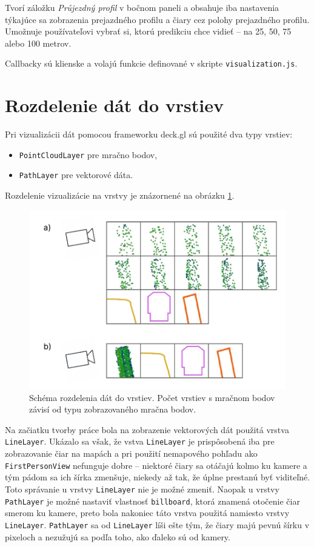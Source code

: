Tvorí záložku \emph{Průjezdný profil} v bočnom paneli a obsahuje iba nastavenia týkajúce sa zobrazenia prejazdného profilu a čiary cez polohy prejazdného profilu. Umožnuje používateľovi vybrať si, ktorú predikciu chce vidieť -- na 25, 50, 75 alebo 100 metrov.

Callbacky sú klienske a volajú funkcie definované v skripte \texttt{visualization.js}.

\section{Rozdelenie dát do vrstiev}
\label{sec:vrstvy}

Pri vizualizácii dát pomocou frameworku deck.gl sú použité dva typy vrstiev:
\begin{itemize}
    \item \texttt{PointCloudLayer} pre mračno bodov,
    \item \texttt{PathLayer} pre vektorové dáta.
\end{itemize}
Rozdelenie vizualizácie na vrstvy je znázornené na obrázku \ref{fig:vrstvy}.

\begin{figure}[h]
    \centering
    \includegraphics[width=0.8\linewidth]{text_prace/obrazky-figures/vrstvy.pdf}
    \caption{Schéma rozdelenia dát do vrstiev. Počet vrstiev s mračnom bodov závisí od typu zobrazovaného mračna bodov.}
    \label{fig:vrstvy}
\end{figure}

Na začiatku tvorby práce bola na zobrazenie vektorových dát použitá vrstva \texttt{LineLayer}. Ukázalo sa však, že vstva \texttt{LineLayer} je prispôsobená iba pre zobrazovanie čiar na mapách a pri použití nemapového pohľadu ako \texttt{FirstPersonView} nefunguje dobre -- niektoré čiary sa otáčajú kolmo ku kamere a tým pádom sa ich šírka zmenšuje, niekedy až tak, že úplne prestanú byť viditeľné. Toto správanie u vrstvy \texttt{LineLayer} nie je možné zmeniť. Naopak u vrstvy \texttt{PathLayer} je možné nastaviť vlastnosť \texttt{billboard}, ktorá znamená otočenie čiar smerom ku kamere, preto bola nakoniec táto vrstva použitá namiesto vrstvy \texttt{LineLayer}. \texttt{PathLayer} sa od \texttt{LineLayer} líši ešte tým, že čiary majú pevnú šírku v pixeloch a nezužujú sa podľa toho, ako ďaleko sú od kamery.


